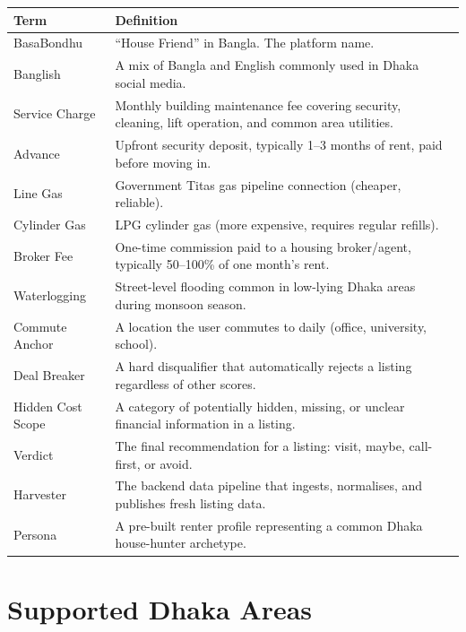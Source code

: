 \documentclass[12pt, a4paper, oneside]{report}
\begin{document}
\begin{longtable}{p{4cm} p{9cm}}
\toprule
\textbf{Term} & \textbf{Definition} \\
\midrule
\endhead
BasaBondhu & ``House Friend'' in Bangla. The platform name. \\
\midrule
Banglish & A mix of Bangla and English commonly used in Dhaka social media. \\
\midrule
Service Charge & Monthly building maintenance fee covering security, cleaning, lift operation, and common area utilities. \\
\midrule
Advance & Upfront security deposit, typically 1--3 months of rent, paid before moving in. \\
\midrule
Line Gas & Government Titas gas pipeline connection (cheaper, reliable). \\
\midrule
Cylinder Gas & LPG cylinder gas (more expensive, requires regular refills). \\
\midrule
Broker Fee & One-time commission paid to a housing broker/agent, typically 50--100\% of one month's rent. \\
\midrule
Waterlogging & Street-level flooding common in low-lying Dhaka areas during monsoon season. \\
\midrule
Commute Anchor & A location the user commutes to daily (office, university, school). \\
\midrule
Deal Breaker & A hard disqualifier that automatically rejects a listing regardless of other scores. \\
\midrule
Hidden Cost Scope & A category of potentially hidden, missing, or unclear financial information in a listing. \\
\midrule
Verdict & The final recommendation for a listing: visit, maybe, call-first, or avoid. \\
\midrule
Harvester & The backend data pipeline that ingests, normalises, and publishes fresh listing data. \\
\midrule
Persona & A pre-built renter profile representing a common Dhaka house-hunter archetype. \\
\bottomrule
\end{longtable}


\appendix

\chapter{Supported Dhaka Areas}
\end{document}
